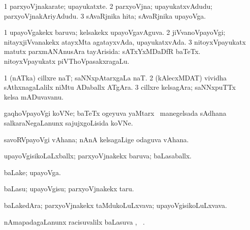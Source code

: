 {{{\bentry
{} 
\gl{\nA}
\bmng
\bnum
\num{1} parxyoVjnakarate; upayukatxte. 
\num{2} parxyoVjna; upayukatxvAdudu; parxyoVjnakAriyAdudu. 
\num{3} sAvaRjnika hita; sAvaRjnika upayoVga. 
\enum
\emng
\eentry

\bentry
{} 
\gl{\gu}
\expl{}
\bmng
\bnum
\num{1} upayoVgakekx baruva; kelsakekx upayoVgavAguva. 
\num{2} jiVvanoVpayoVgi; nitayxjiVvanakekx atayxMta agatayxvAda, upayukatxvAda.
\num{3} nitoyxVpayukatx matutx parxmANAnusAra tayArisida:  sATxYxMDaDfR baTeTx.  nitoyxVpayukatx piVThoVpasakxragaLu. 
\enum
\emng
\eentry

\bentry
{}
\gl{\nA}
\expl{}
\bmng
\bnum
\num{1} (nATka) cillxre naT; saNNxpAtarxgaLa naT. 
\num{2} (kAlecxMDAT) vividha sAthxnagaLalilx niMtu ADaballx ATgAra. 
\num{3} cillxre kelsagAra; saNNxpuTTx kelsa mADuvavanu. 
\enum
\emng
\eentry

\bentry
{}
\gl{\nA}
\expl{}
\bmng
gaqhoVpayoVgi koVNe; baTeTx ogeyuva yaMtarx \mo\ manegelsada sAdhana salkaraNegaLanunx sajujxgoLisida koVNe. 
\emng
\eentry

\bentry
{}
\gl{\nA}
\expl{}
\bmng
{} 
\emng
\eentry

\bentry
{}
\gl{\nA}
\expl{}
\bmng
savoRVpayoVgi vAhana; nAnA kelsagaLige odaguva vAhana. 
\emng
\eentry

\bentry
{} 
\gl{\gu}
\expl{}
\bmng
upayoVgisikoLaLxballx; parxyoVjnakekx baruva; baLasaballx. 
\emng
\eentry

\bentry
{} 
\gl{\nA}
\expl{}
\bmng
baLake; upayoVga. 
\emng
\eentry

\bentry
{} 
\gl{\sakirx}
\expl{}
\bmng
baLasu; upayoVgisu; parxyoVjnakekx taru. 
\emng
\eentry

\bentry
{} 
\gl{\nA}
\expl{}
\bmng
baLakedAra; parxyoVjnakekx taMdukoLuLxvava; upayoVgisikoLuLxvava. 
\emng
\eentry

\bentry
{} 
\gl{\uparx}
\expl{}
\bmng
nAmapadagaLanunx racisuvalilx baLasuva \uparx, \udA\ . 
\emng
\eentry

}}}
